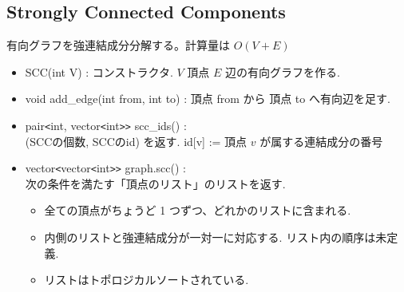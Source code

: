 \subsection{Strongly Connected Components}

有向グラフを強連結成分分解する。計算量は $O(V + E)$
\begin{itemize}
    \item SCC(int V) : コンストラクタ. $V$ 頂点 $E$ 辺の有向グラフを作る.
    \item void add\_edge(int from, int to) : 頂点 from から 頂点 to へ有向辺を足す.
    \item pair\verb|<|int, vector\verb|<|int\verb|>>| scc\_ids() : \\ (SCCの個数, SCCのid) を返す. id[v] := 頂点 $v$ が属する連結成分の番号
    \item vector\verb|<|vector\verb|<|int\verb|>>|  graph.scc() : \\ 次の条件を満たす「頂点のリスト」のリストを返す.
    \begin{itemize}
        \item 全ての頂点がちょうど 1 つずつ、どれかのリストに含まれる.
        \item 内側のリストと強連結成分が一対一に対応する. リスト内の順序は未定義.
        \item リストはトポロジカルソートされている.
    \end{itemize}
\end{itemize}


